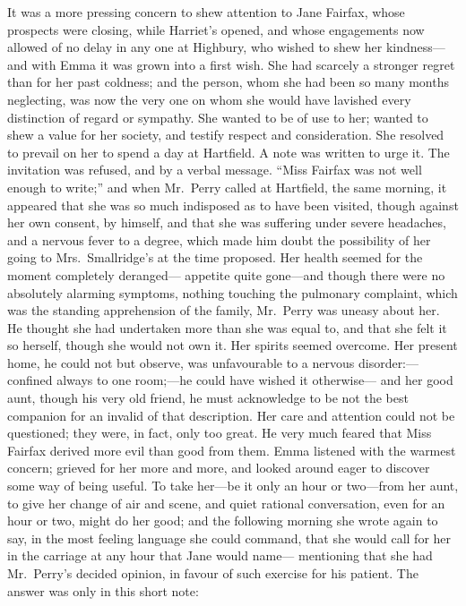 It was a more pressing concern to shew attention to Jane Fairfax,
whose prospects were closing, while Harriet's opened, and whose
engagements now allowed of no delay in any one at Highbury, who wished
to shew her kindness---and with Emma it was grown into a first wish.
She had scarcely a stronger regret than for her past coldness;
and the person, whom she had been so many months neglecting, was now
the very one on whom she would have lavished every distinction of
regard or sympathy.  She wanted to be of use to her; wanted to shew
a value for her society, and testify respect and consideration.
She resolved to prevail on her to spend a day at Hartfield.
A note was written to urge it.  The invitation was refused, and by
a verbal message.  ``Miss Fairfax was not well enough to write;''
and when Mr.\ Perry called at Hartfield, the same morning,
it appeared that she was so much indisposed as to have been visited,
though against her own consent, by himself, and that she was suffering
under severe headaches, and a nervous fever to a degree, which made
him doubt the possibility of her going to Mrs.\ Smallridge's at the
time proposed.  Her health seemed for the moment completely deranged---%
appetite quite gone---and though there were no absolutely
alarming symptoms, nothing touching the pulmonary complaint,
which was the standing apprehension of the family, Mr.\ Perry was
uneasy about her.  He thought she had undertaken more than she
was equal to, and that she felt it so herself, though she would
not own it.  Her spirits seemed overcome.  Her present home,
he could not but observe, was unfavourable to a nervous disorder:---%
confined always to one room;---he could have wished it otherwise---%
and her good aunt, though his very old friend, he must acknowledge
to be not the best companion for an invalid of that description.
Her care and attention could not be questioned; they were, in fact,
only too great.  He very much feared that Miss Fairfax derived more
evil than good from them.  Emma listened with the warmest concern;
grieved for her more and more, and looked around eager to discover
some way of being useful.  To take her---be it only an hour
or two---from her aunt, to give her change of air and scene,
and quiet rational conversation, even for an hour or two,
might do her good; and the following morning she wrote again to say,
in the most feeling language she could command, that she would
call for her in the carriage at any hour that Jane would name---%
mentioning that she had Mr.\ Perry's decided opinion, in favour
of such exercise for his patient.  The answer was only in this
short note:

